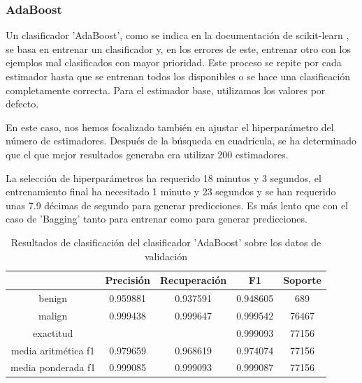 \subsubsection{AdaBoost} %

Un clasificador 'AdaBoost', como se indica en la documentación de scikit-learn \cite{sklearnadaboost}, se basa en entrenar un clasificador y, en los errores de este, entrenar otro con los ejemplos mal clasificados con mayor prioridad. Este proceso se repite por cada estimador hasta que se entrenan todos los disponibles o se hace una clasificación completamente correcta. Para el estimador base, utilizamos los valores por defecto.

En este caso, nos hemos focalizado también en ajustar el hiperparámetro del número de estimadores. Después de la búsqueda en cuadrícula, se ha determinado que el que mejor resultados generaba era utilizar 200 estimadores.

La selección de hiperparámetros ha requerido 18 minutos y 3 segundos, el entrenamiento final ha necesitado 1 minuto y 23 segundos y se han requerido unas 7.9 décimas de segundo para generar predicciones. Es más lento que con el caso de 'Bagging' tanto para entrenar como para generar predicciones.

\begin{table}[H]
    \begin{center}
        \begin{tabular}{|c | c c c | c |} 
            \hline
            & \textbf{Precisión} & \textbf{Recuperación} & \textbf{F1}  & \textbf{Soporte} \\
            \hline
            benign               & 0.959881 & 0.937591 & 0.948605  &   689 \\
            malign               & 0.999438 & 0.999647 & 0.999542  & 76467 \\
            \hline
            exactitud            &          &          & 0.999093  & 77156 \\
            media aritmética f1  & 0.979659 & 0.968619 & 0.974074  & 77156 \\
            media ponderada f1   & 0.999085 & 0.999093 & 0.999087  & 77156 \\
            \hline
        \end{tabular}
    \end{center}
    \caption{Resultados de clasificación del clasificador 'AdaBoost' sobre los datos de validación}
    \label{table:adaboostresults}
\end{table}

